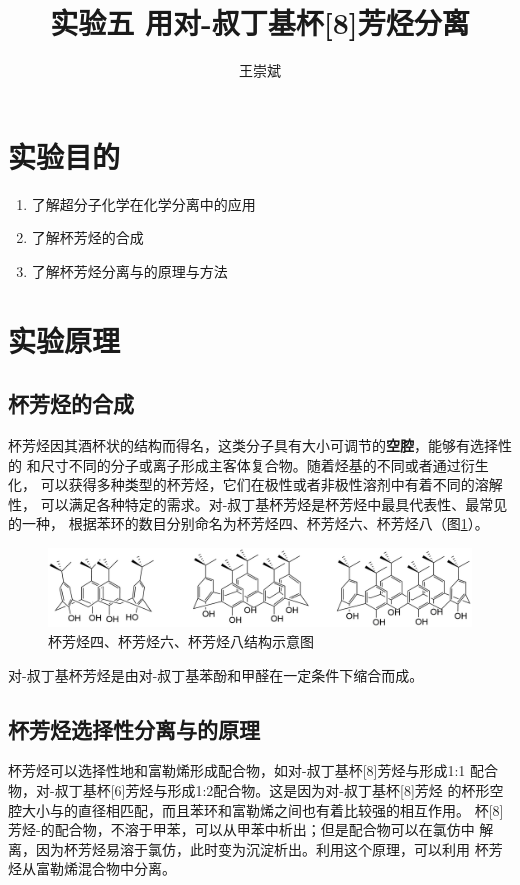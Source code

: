 \documentclass[a4paper,zihao=5,UTF8]{ctexart}
\title{\textbf{实验五 用对-叔丁基杯[8]芳烃分离\ce{C_{60}}
\cite{inorganic_chemistry_1}}}
\author{王崇斌\;1800011716}
\begin{document}
	\pagestyle{fancy}
	\pagestyle{fancy}
	\chead{}
	\rhead{\today}
	\maketitle
    \thispagestyle{fancy}
    \section{实验目的}
    \begin{enumerate}
        \item 了解超分子化学在化学分离中的应用
        \item 了解杯芳烃的合成
        \item 了解杯芳烃分离与的原理与方法
    \end{enumerate}
	\section{实验原理}
    \subsection{杯芳烃的合成}
    杯芳烃因其酒杯状的结构而得名，这类分子具有大小可调节的\textbf{空腔}，能够有选择性的
    和尺寸不同的分子或离子形成主客体复合物。随着烃基的不同或者通过衍生化，
    可以获得多种类型的杯芳烃，它们在极性或者非极性溶剂中有着不同的溶解性，
    可以满足各种特定的需求。对-叔丁基杯芳烃是杯芳烃中最具代表性、最常见的一种，
    根据苯环的数目分别命名为杯芳烃四、杯芳烃六、杯芳烃八（图\ref{calixarene}）。
    \begin{figure}[htbp]
        \centering
        \includegraphics[scale=0.3]{calixarene.png}
        \caption{杯芳烃四、杯芳烃六、杯芳烃八结构示意图}
        \label{calixarene}
    \end{figure}
    \par 
    对-叔丁基杯芳烃是由对-叔丁基苯酚和甲醛在一定条件下缩合而成。
    \subsection{杯芳烃选择性分离与的原理}
    杯芳烃可以选择性地和富勒烯形成配合物，如对-叔丁基杯[8]芳烃与形成1:1
    配合物，对-叔丁基杯[6]芳烃与形成1:2配合物。这是因为对-叔丁基杯[8]芳烃
    的杯形空腔大小与的直径相匹配，而且苯环和富勒烯之间也有着比较强的相互作用。
    杯[8]芳烃-的配合物，不溶于甲苯，可以从甲苯中析出；但是配合物可以在氯仿中
    解离，因为杯芳烃易溶于氯仿，此时变为沉淀析出。利用这个原理，可以利用
    杯芳烃从富勒烯混合物中分离。
\end{document}
